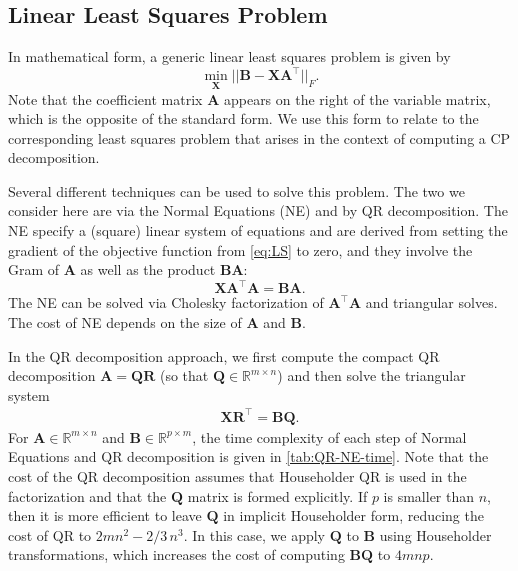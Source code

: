 \documentclass{article}
\newcommand{\mat}[1]{\mathbf{#1}}
\begin{document}
\subsection{Linear Least Squares Problem}
\label{sec:LS}

In mathematical form, a generic linear least squares problem is given by 
\begin{equation}
\label{eq:LS}
\min_{\mat{X}}||\mat{B} - \mat{X}\mat{A}^\top||_{F}.
\end{equation}
Note that the coefficient matrix $\mat{A}$ appears on the right of the variable matrix, which is the opposite of the standard form.
We use this form to relate to the corresponding least squares problem that arises in the context of computing a CP decomposition.

Several different techniques can be used to solve this problem.
The two we consider here are via the Normal Equations (NE) and by QR decomposition.
The NE specify a (square) linear system of equations and are derived from setting the gradient of the objective function from \cref{eq:LS} to zero, and they involve the Gram of $\mat{A}$ as well as the product $\mat{B}\mat{A}$:
\begin{equation}
\label{eq:NE}
\mat{X}\mat{A}^\top\mat{A} = \mat{B}\mat{A}.
\end{equation}
The NE can be solved via Cholesky factorization of $\mat{A}^\top\mat{A}$ and triangular solves.
The cost of NE depends on the size of $\mat{A}$ and $\mat{B}$. 

In the QR decomposition approach, we first compute the compact QR decomposition $\mat{A} = \mat{Q}\mat{R}$ (so that $\mat{Q}\in \mathbb{R}^{m \times n}$) and then solve the  triangular system
\begin{align}
\label{eq:QR}  
\mat{X} \mat{R}^\top = \mat{B}\mat{Q}.
\end{align}
For $\mat{A} \in \mathbb{R}^{m \times n}$ and $\mat{B} \in \mathbb{R}^{p \times m}$, the time complexity of each step of Normal Equations and QR decomposition is given in \cref{tab:QR-NE-time}.
Note that the cost of the QR decomposition assumes that Householder QR is used in the factorization and that the $\mat{Q}$ matrix is formed explicitly.
If $p$ is smaller than $n$, then it is more efficient to leave $\mat{Q}$ in implicit Householder form, reducing the cost of QR to $2mn^2-2/3 \,n^3$.
In this case, we apply $\mat{Q}$ to $\mat{B}$ using Householder transformations, which increases the cost of computing $\mat{B}\mat{Q}$ to $4mnp$. 
\end{document}

